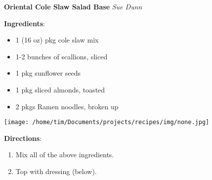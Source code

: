 \documentclass[11pt, twoside, openany]{book}
\begin{document}
\noindent\begin{minipage}[t]{\linewidth}%
{\Large\textbf{Oriental Cole Slaw Salad Base}} \label{oriental-cole-slaw-salad-base}\hfill\textit{Sue Dunn}\\
\noindent\begin{minipage}[t]{0.78\linewidth}%
\textbf{Ingredients}:\vspace{-3mm}
\begin{multicols}{2}
\begin{itemize}\setlength\itemsep{-1mm}
\item 1 (16 oz) pkg cole slaw mix
\item 1-2 bunches of scallions, sliced
\item 1 pkg sunflower seeds
\item 1 pkg sliced almonds, toasted
\item 2 pkgs Ramen noodles, broken up
\end{itemize}
\end{multicols}
\end{minipage}
\noindent\begin{minipage}[t]{0.18\linewidth}
\centering \strut\vspace*{-\baselineskip}\newline
\texttt{[image: /home/tim/Documents/projects/recipes/img/none.jpg]}\\
\end{minipage}\vspace{3mm}
\textbf{Directions}:
\vspace{-3mm}\begin{enumerate}\setlength\itemsep{-1mm}
\item Mix all of the above ingredients.
\item Top with dressing (below).
\end{enumerate}
\end{minipage}\vspace{8mm}
\end{document}
